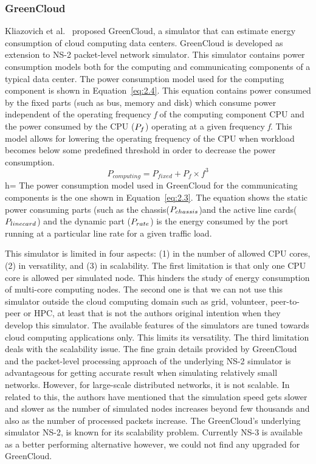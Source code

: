 \subsubsection{GreenCloud}
Kliazovich et al.{\ }\cite{DBLP:journals/tjs/KliazovichBK12} proposed GreenCloud, a simulator that can estimate energy consumption of cloud computing data centers. GreenCloud is developed as extension to NS-2 packet-level network simulator. This simulator contains power consumption models both for the computing and communicating components of a typical data center. The power consumption model used for the computing component is shown in Equation~\ref{eq:2.4}. This equation contains power consumed by the fixed parts (such as bus, memory and disk) which consume power independent of the operating frequency \emph{f} of the computing component CPU and the power consumed by the CPU (\($$P_f$$\)) operating at a given frequency \emph{f}. This model allows for lowering the operating frequency of the CPU when workload becomes below some predefined threshold in order to decrease the power consumption. 
\begin{equation} \label{eq:2.4}
P_{computing} = P_{fixed} + P_f \times f^3
\end{equation}h=
The power consumption model used in GreenCloud for the communicating components is the one shown in Equation~\ref{eq:2.3}. The equation shows the static power consuming parts (such as the chassis(\($$P_{chassis}$$\))and the active line cards(\($$P_{linecard}$$\)) and the dynamic part (\($$P_{rate}$$\)) is the energy consumed by the port running at a particular line rate for a given traffic load. 

This simulator is limited in four aspects: (1) in the number of allowed CPU cores, (2) in versatility, and (3) in scalability. The first limitation is that only one CPU core is allowed per simulated node. This hinders the study of energy consumption of multi-core computing nodes. The second one is that we can not use this simulator outside the cloud computing domain such as grid, volunteer, peer-to-peer or HPC, at least that is not the authors original intention when they develop this simulator. The available features of the simulators are tuned towards cloud computing applications only. This limits its versatility. The third limitation deals with the scalability issue. The fine grain details provided by GreenCloud and the packet-level processing approach of the underlying NS-2 simulator is advantageous for getting accurate result when simulating relatively small networks. However, for large-scale distributed networks, it is not scalable. In related to this, the authors have mentioned that the simulation speed gets slower and slower as the number of simulated nodes increases beyond few thousands and also as the number of processed packets increase. The GreenCloud's underlying simulator NS-2, is known for its scalability problem. Currently NS-3 is available as a better performing alternative \cite{DBLP:conf/icc/WeingartnerLW09} however, we could not find any upgraded for GreenCloud.





